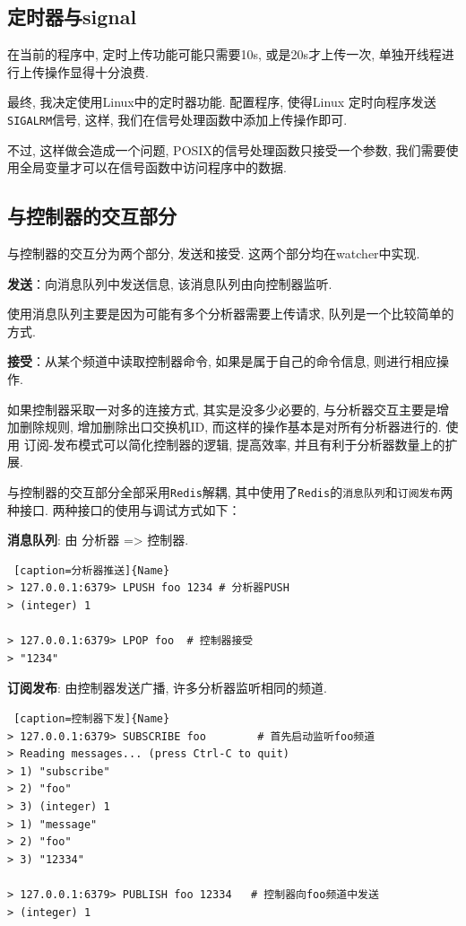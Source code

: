 \subsection{定时器与signal}

在当前的程序中, 定时上传功能可能只需要10s, 或是20s才上传一次,
单独开线程进行上传操作显得十分浪费.

最终, 我决定使用Linux中的定时器功能. 配置程序, 使得Linux
定时向程序发送\texttt{SIGALRM}信号,
这样, 我们在信号处理函数中添加上传操作即可.

不过, 这样做会造成一个问题, POSIX的信号处理函数只接受一个参数,
我们需要使用全局变量才可以在信号函数中访问程序中的数据.

\subsection{与控制器的交互部分}

与控制器的交互分为两个部分, 发送和接受. 这两个部分均在watcher中实现.

\textbf{发送}：向消息队列中发送信息, 该消息队列由向控制器监听.

使用消息队列主要是因为可能有多个分析器需要上传请求, 队列是一个比较简单的方式.

\textbf{接受}：从某个频道中读取控制器命令, 如果是属于自己的命令信息, 则进行相应操作.

如果控制器采取一对多的连接方式, 其实是没多少必要的, 与分析器交互主要是增加删除规则,
增加删除出口交换机ID, 而这样的操作基本是对所有分析器进行的. 使用
订阅-发布模式可以简化控制器的逻辑, 提高效率, 并且有利于分析器数量上的扩展.

与控制器的交互部分全部采用\texttt{Redis}解耦,
其中使用了\texttt{Redis}的\texttt{消息队列}和\texttt{订阅发布}两种接口.
两种接口的使用与调试方式如下：

\textbf{消息队列}: 由 分析器 =\textgreater{} 控制器.

\begin{lstlisting} [caption=分析器推送]{Name}
> 127.0.0.1:6379> LPUSH foo 1234 # 分析器PUSH
> (integer) 1

> 127.0.0.1:6379> LPOP foo  # 控制器接受
> "1234"
\end{lstlisting}


\textbf{订阅发布}: 由控制器发送广播, 许多分析器监听相同的频道.


\begin{lstlisting} [caption=控制器下发]{Name}
> 127.0.0.1:6379> SUBSCRIBE foo        # 首先启动监听foo频道
> Reading messages... (press Ctrl-C to quit)
> 1) "subscribe"
> 2) "foo"
> 3) (integer) 1
> 1) "message"
> 2) "foo"
> 3) "12334"

> 127.0.0.1:6379> PUBLISH foo 12334   # 控制器向foo频道中发送
> (integer) 1
\end{lstlisting}



